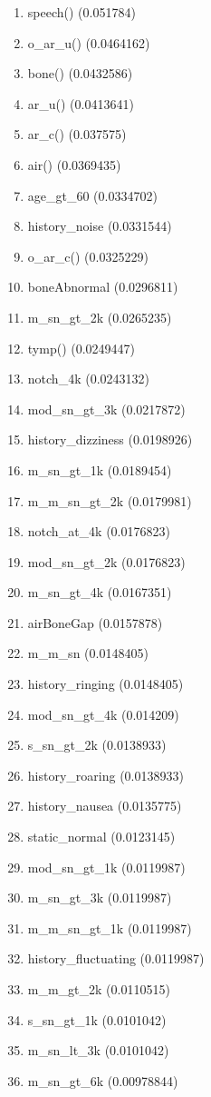 \begin{enumerate}
\item speech() (0.051784)
\item o\_ar\_u() (0.0464162)
\item bone() (0.0432586)
\item ar\_u() (0.0413641)
\item ar\_c() (0.037575)
\item air() (0.0369435)
\item age\_gt\_60 (0.0334702)
\item history\_noise (0.0331544)
\item o\_ar\_c() (0.0325229)
\item boneAbnormal (0.0296811)
\item m\_sn\_gt\_2k (0.0265235)
\item tymp() (0.0249447)
\item notch\_4k (0.0243132)
\item mod\_sn\_gt\_3k (0.0217872)
\item history\_dizziness (0.0198926)
\item m\_sn\_gt\_1k (0.0189454)
\item m\_m\_sn\_gt\_2k (0.0179981)
\item notch\_at\_4k (0.0176823)
\item mod\_sn\_gt\_2k (0.0176823)
\item m\_sn\_gt\_4k (0.0167351)
\item airBoneGap (0.0157878)
\item m\_m\_sn (0.0148405)
\item history\_ringing (0.0148405)
\item mod\_sn\_gt\_4k (0.014209)
\item s\_sn\_gt\_2k (0.0138933)
\item history\_roaring (0.0138933)
\item history\_nausea (0.0135775)
\item static\_normal (0.0123145)
\item mod\_sn\_gt\_1k (0.0119987)
\item m\_sn\_gt\_3k (0.0119987)
\item m\_m\_sn\_gt\_1k (0.0119987)
\item history\_fluctuating (0.0119987)
\item m\_m\_gt\_2k (0.0110515)
\item s\_sn\_gt\_1k (0.0101042)
\item m\_sn\_lt\_3k (0.0101042)
\item m\_sn\_gt\_6k (0.00978844)

\end{enumerate}
